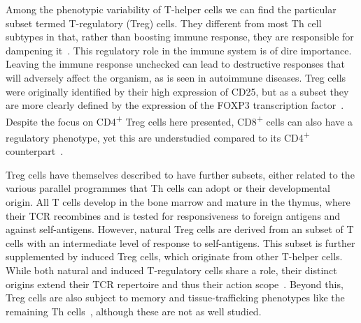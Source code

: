 Among the phenotypic variability of T-helper cells we can find the particular subset termed T-regulatory (Treg) cells. They different from most Th cell subtypes in that, rather than boosting immune response, they are responsible for dampening it~\citep{sakaguchi_immunologic_1995}. This regulatory role in the immune system is of dire importance. Leaving the immune response unchecked can lead to destructive responses that will adversely affect the organism, as is seen in autoimmune diseases. Treg cells were originally identified by their high expression of CD25, but as a subset they are more clearly defined by the expression of the FOXP3 transcription factor~\citep{hori_control_2003}. Despite the focus on CD4\textsuperscript{+} Treg cells here presented, CD8\textsuperscript{+} cells can also have a regulatory phenotype, yet this are understudied compared to its CD4\textsuperscript{+} counterpart~\citep{yu_recent_2018}.

Treg cells have themselves described to have further subsets, either related to the various parallel programmes that Th cells can adopt or their developmental origin. All T cells develop in the bone marrow and mature in the thymus, where their TCR recombines and is tested for responsiveness to foreign antigens and against self-antigens. However, natural Treg cells are derived from an subset of T cells with an intermediate level of response to self-antigens. This subset is further supplemented by induced Treg cells, which originate from other T-helper cells. While both natural and induced T-regulatory cells share a role, their distinct origins extend their TCR repertoire and thus their action scope~\citep{zhang_subsets_2014}. Beyond this, Treg cells are also subject to memory and tissue-trafficking phenotypes like the remaining Th cells~\citep{huehn_developmental_2004}, although these are not as well studied.

